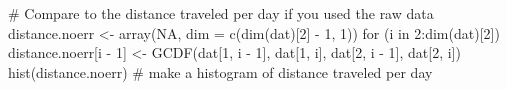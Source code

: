 \begin{Schunk}
\begin{Sinput}
 # Compare to the distance traveled per day if you used the raw data
 distance.noerr <- array(NA, dim = c(dim(dat)[2] - 1, 1))
 for (i in 2:dim(dat)[2]) {
   distance.noerr[i - 1] <- GCDF(dat[1, i - 1], dat[1, i], dat[2, i - 1], dat[2, i])
 }
 hist(distance.noerr) # make a histogram of distance traveled per day
\end{Sinput}
\end{Schunk}
